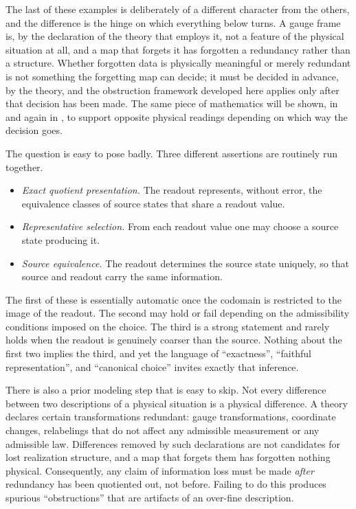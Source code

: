 \documentclass[11pt,reqno]{amsart}
\theoremstyle{plain}
\theoremstyle{definition}
\theoremstyle{remark}
\begin{document}
The last of these examples is deliberately of a different character from the others, and the difference is the hinge on which everything below turns. A gauge frame is, by the declaration of the theory that employs it, not a feature of the physical situation at all, and a map that forgets it has forgotten a redundancy rather than a structure. Whether forgotten data is physically meaningful or merely redundant is not something the forgetting map can decide; it must be decided in advance, by the theory, and the obstruction framework developed here applies only after that decision has been made. The same piece of mathematics will be shown, in  and again in , to support opposite physical readings depending on which way the decision goes.

The question is easy to pose badly. Three different assertions are routinely run together.

\begin{itemize}
\item \emph{Exact quotient presentation.} The readout represents, without error, the equivalence classes of source states that share a readout value.
\item \emph{Representative selection.} From each readout value one may choose a source state producing it.
\item \emph{Source equivalence.} The readout determines the source state uniquely, so that source and readout carry the same information.
\end{itemize}

The first of these is essentially automatic once the codomain is restricted to the image of the readout. The second may hold or fail depending on the admissibility conditions imposed on the choice. The third is a strong statement and rarely holds when the readout is genuinely coarser than the source. Nothing about the first two implies the third, and yet the language of ``exactness'', ``faithful representation'', and ``canonical choice'' invites exactly that inference.

There is also a prior modeling step that is easy to skip. Not every difference between two descriptions of a physical situation is a physical difference. A theory declares certain transformations redundant: gauge transformations, coordinate changes, relabelings that do not affect any admissible measurement or any admissible law. Differences removed by such declarations are not candidates for lost realization structure, and a map that forgets them has forgotten nothing physical. Consequently, any claim of information loss must be made \emph{after} redundancy has been quotiented out, not before. Failing to do this produces spurious ``obstructions'' that are artifacts of an over-fine description.
\end{document}
